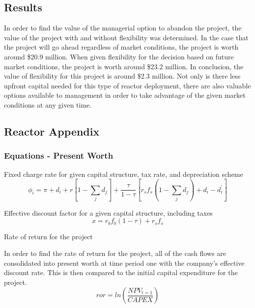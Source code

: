 \subsection{Results}

In order to find the value of the managerial option to abandon the project, the value of the project with and without flexibility was determined.  In the case that the project will go ahead regardless of market conditions, the project is worth around \$20.9 million.  When given flexibility for the decision based on future market conditions, the project is worth around \$23.2 million.  In conclusion, the value of flexibility for this project is around \$2.3 million.  Not only is there less upfront capital needed for this type of reactor deployment, there are also valuable options available to management in order to take advantage of the given market conditions at any given time.





\subsection{Reactor Appendix}
\subsubsection{Equations - Present Worth}

Fixed charge rate for given capital structure, tax rate, and depreciation scheme
\begin{equation}
	\phi_i = \pi + d_i + r \left[  1 - \sum_j d_j   
				\right]
			+ \frac{\tau}{1-\tau}
				\left[  r_s f_s (1- \sum_j d_j) + d_i - d_i^\prime
				\right]
\end{equation}

Effective discount factor for a given capital structure, including taxes
\begin{equation}
x = r_b f_b (1-\tau)  + r_s f_s
\end{equation}

Rate of return for the project

In order to find the rate of return for the project, all of the cash flows are consolidated into present worth at time period one with the company’s effective discount rate.  This is then compared to the initial capital expenditure for the project.
\begin{equation}
ror = ln (  \frac{ NPV_{t=1} }{CAPEX} )
\end{equation}


